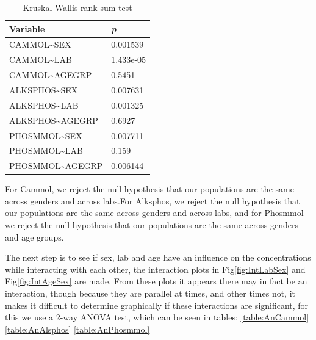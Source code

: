 \documentclass{article}
\begin{document}
    \begin{table}[H]
    \begin{center}
    \scriptsize
    \begin{tabular}{|ll|}
        \hline
        Variable & \textit{p} \\
        \hline 
        \hline
        CAMMOL\textasciitilde SEX & 0.001539 \\
        CAMMOL\textasciitilde LAB & 1.433e-05 \\
        CAMMOL\textasciitilde AGEGRP & 0.5451 \\
        \hline
        \hline 
        ALKSPHOS\textasciitilde SEX & 0.007631 \\
        ALKSPHOS\textasciitilde LAB & 0.001325 \\
        ALKSPHOS\textasciitilde AGEGRP & 0.6927 \\
        \hline
        \hline 
        PHOSMMOL\textasciitilde SEX & 0.007711 \\
        PHOSMMOL\textasciitilde LAB & 0.159 \\
        PHOSMMOL\textasciitilde AGEGRP & 0.006144 \\
        \hline
    \end{tabular}
    \caption{Kruskal-Wallis rank sum test}
    \label{table:krusk}
    \end{center}
    \end{table}
    
  For Cammol, we reject the null hypothesis that our populations are the same across genders and across labs.For Alksphos, we reject the null hypothesis that our populations are the same across genders and across labs, and for Phosmmol we reject the null hypothesis that our populations are the same across genders and age groups.

      The next step is to see if sex, lab and age have an influence on the concentrations while interacting with each other, the interaction plots in Fig\ref{fig:IntLabSex} and Fig\ref{fig:IntAgeSex} are made. From these plots it appears there may in fact be an interaction, though because they are parallel at times, and other times not, it makes it difficult to determine graphically if these interactions are significant, for this we use a 2-way ANOVA test, which can be seen in tables: \ref{table:AnCammol} \ref{table:AnAlsphos} \ref{table:AnPhosmmol}
\end{document}
